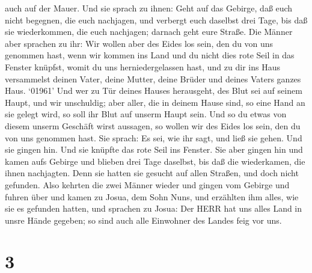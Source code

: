 auch auf der Mauer.  Und sie sprach zu ihnen: Geht auf das
Gebirge, daß euch nicht begegnen, die euch nachjagen, und verbergt euch
daselbst drei Tage, bis daß sie wiederkommen, die euch nachjagen;
darnach geht eure Straße.  Die Männer aber sprachen zu ihr:
Wir wollen aber des Eides los sein, den du von uns genommen hast,
 wenn wir kommen ins Land und du nicht dies rote Seil in
das Fenster knüpfst, womit du uns herniedergelassen hast, und zu dir ins
Haus versammelst deinen Vater, deine Mutter, deine Brüder und deines
Vaters ganzes Haus.  `01961' Und wer zu Tür deines Hauses
herausgeht, des Blut sei auf seinem Haupt, und wir unschuldig; aber
aller, die in deinem Hause sind, so eine Hand an sie gelegt wird, so
soll ihr Blut auf unserm Haupt sein.  Und so du etwas von
diesem unserm Geschäft wirst aussagen, so wollen wir des Eides los sein,
den du von uns genommen hast.  Sie sprach: Es sei, wie ihr
sagt, und ließ sie gehen. Und sie gingen hin. Und sie knüpfte das rote
Seil ins Fenster.  Sie aber gingen hin und kamen aufs
Gebirge und blieben drei Tage daselbst, bis daß die wiederkamen, die
ihnen nachjagten. Denn sie hatten sie gesucht auf allen Straßen, und
doch nicht gefunden.  Also kehrten die zwei Männer wieder
und gingen vom Gebirge und fuhren über und kamen zu Josua, dem Sohn
Nuns, und erzählten ihm alles, wie sie es gefunden hatten, 
und sprachen zu Josua: Der HERR hat uns alles Land in unsre Hände
gegeben; so sind auch alle Einwohner des Landes feig vor uns.

\hypertarget{section-2}{%
\section{3}\label{section-2}}

